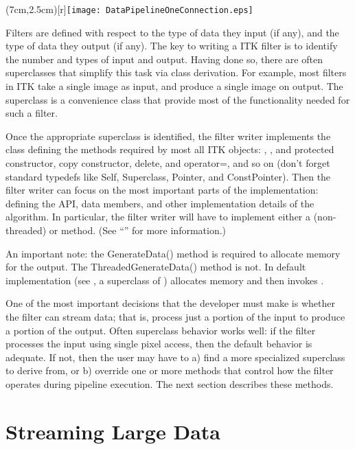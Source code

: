 \parpic(7cm,2.5cm)[r]{\texttt{[image: DataPipelineOneConnection.eps]}}


Filters are defined with respect to the type of data they input (if any), and
the type of data they output (if any). The key to writing a ITK filter is to
identify the number and types of input and output. Having done so, there are
often superclasses that simplify this task via class derivation. For example,
most filters in ITK take a single image as input, and produce a single image
on output. The superclass  is a convenience class that
provide most of the functionality needed for such a filter.

Once the appropriate superclass is identified, the filter writer implements the
class defining the methods required by most all ITK objects: ,
, and protected constructor, copy constructor, delete, and
operator=, and so on (don't forget standard typedefs like Self, Superclass,
Pointer, and ConstPointer). Then the filter writer can focus on the most
important parts of the implementation: defining the API, data members, and
other implementation details of the algorithm. In particular, the filter writer
will have to implement either a  (non-threaded) or
 method. (See ``'' for more information.)

An important note: the GenerateData() method is required to allocate memory for
the output. The ThreadedGenerateData() method is not. In default implementation
(see , a superclass of )
 allocates memory and then invokes
.

One of the most important decisions that the developer must make is whether
the filter can stream data; that is, process just a portion of the input to
produce a portion of the output. Often superclass behavior works well: if the
filter processes the input using single pixel access, then the default
behavior is adequate. If not, then the user may have to a) find a more
specialized superclass to derive from, or b) override one or more methods
that control how the filter operates during pipeline execution. The next
section describes these methods.



\section{Streaming Large Data}
\label{sec:StreamingLargeData}

